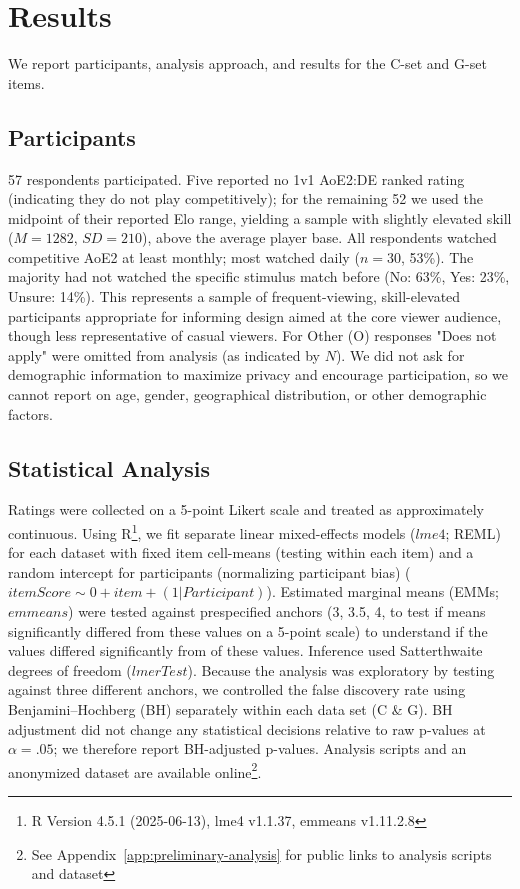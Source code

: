 \section{Results}
We report participants, analysis approach, and results for the C-set and G-set items.

\subsection{Participants}
57 respondents participated. Five reported no 1v1 AoE2:DE ranked rating (indicating they do not play competitively); for the remaining 52 we used the midpoint of their reported Elo range, yielding a sample with slightly elevated skill ($M = 1282$, $SD = 210$), above the average player base. All respondents watched competitive AoE2 at least monthly; most watched daily ($n=30$, 53\%). The majority had not watched the specific stimulus match before (No: 63\%, Yes: 23\%, Unsure: 14\%). This represents a sample of frequent-viewing, skill-elevated participants appropriate for informing design aimed at the core viewer audience, though less representative of casual viewers.
For Other (O) responses "Does not apply" were omitted from analysis (as indicated by $N$). We did not ask for demographic information to maximize privacy and encourage participation, so we cannot report on age, gender, geographical distribution, or other demographic factors.

\subsection{Statistical Analysis}
Ratings were collected on a 5-point Likert scale and treated as approximately continuous. Using R\footnote{R Version 4.5.1 (2025-06-13), lme4 v1.1.37, emmeans v1.11.2.8}, we fit separate linear mixed-effects models ($lme4$; REML) for each dataset with fixed item cell-means  (testing within each item) and a random intercept for participants (normalizing participant bias) ($itemScore \sim 0 + item + (1|Participant)$). Estimated marginal means (EMMs; $emmeans$) were tested against prespecified anchors (3, 3.5, 4, to test if means significantly differed from these values on a 5-point scale) to understand if the values differed significantly from of these values. Inference used Satterthwaite degrees of freedom ($lmerTest$). Because the analysis was exploratory by testing against three different anchors, we controlled the false discovery rate using Benjamini--Hochberg (BH) separately within each data set (C \& G). BH adjustment did not change any statistical decisions relative to raw p-values at $\alpha = .05$; we therefore report BH-adjusted p-values. Analysis scripts and an anonymized dataset are available online\footnote{See Appendix~\ref{app:preliminary-analysis} for public links to analysis scripts and dataset}.


